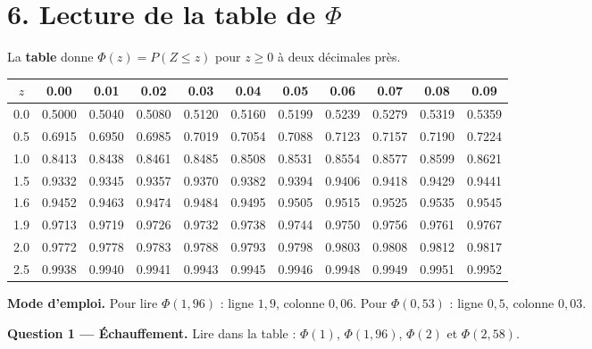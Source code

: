 \section*{6. Lecture de la table de $\Phi$}

La \textbf{table} donne $\Phi(z)=P(Z\le z)$ pour $z\ge 0$ à deux
décimales près.

\begin{center}
\renewcommand{\arraystretch}{1.2}
\small
\begin{tabular}{|c|c|c|c|c|c|c|c|c|c|c|}
  \hline
  $z$ & 0.00 & 0.01 & 0.02 & 0.03 & 0.04 & 0.05 & 0.06 & 0.07 & 0.08 & 0.09 \\
  \hline
  0.0 & 0.5000 & 0.5040 & 0.5080 & 0.5120 & 0.5160 & 0.5199 & 0.5239 & 0.5279 & 0.5319 & 0.5359 \\
  \hline
  0.5 & 0.6915 & 0.6950 & 0.6985 & 0.7019 & 0.7054 & 0.7088 & 0.7123 & 0.7157 & 0.7190 & 0.7224 \\
  \hline
  1.0 & 0.8413 & 0.8438 & 0.8461 & 0.8485 & 0.8508 & 0.8531 & 0.8554 & 0.8577 & 0.8599 & 0.8621 \\
  \hline
  1.5 & 0.9332 & 0.9345 & 0.9357 & 0.9370 & 0.9382 & 0.9394 & 0.9406 & 0.9418 & 0.9429 & 0.9441 \\
  \hline
  1.6 & 0.9452 & 0.9463 & 0.9474 & 0.9484 & 0.9495 & 0.9505 & 0.9515 & 0.9525 & 0.9535 & 0.9545 \\
  \hline
  1.9 & 0.9713 & 0.9719 & 0.9726 & 0.9732 & 0.9738 & 0.9744 & 0.9750 & 0.9756 & 0.9761 & 0.9767 \\
  \hline
  2.0 & 0.9772 & 0.9778 & 0.9783 & 0.9788 & 0.9793 & 0.9798 & 0.9803 & 0.9808 & 0.9812 & 0.9817 \\
  \hline
  2.5 & 0.9938 & 0.9940 & 0.9941 & 0.9943 & 0.9945 & 0.9946 & 0.9948 & 0.9949 & 0.9951 & 0.9952 \\
  \hline
\end{tabular}
\end{center}

\textbf{Mode d'emploi.}
Pour lire $\Phi(1{,}96)$ : ligne $1{,}9$, colonne $0{,}06$. Pour
$\Phi(0{,}53)$ : ligne $0{,}5$, colonne $0{,}03$.

\medskip

\textbf{Question 1 --- Échauffement.}
Lire dans la table : $\Phi(1)$, $\Phi(1{,}96)$, $\Phi(2)$ et
$\Phi(2{,}58)$.


